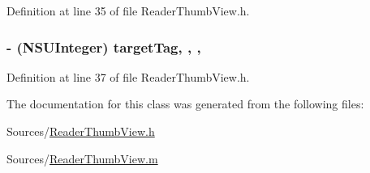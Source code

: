 Definition at line 35 of file Reader\-Thumb\-View.\-h.

\hypertarget{interface_reader_thumb_view_a41943cc8db6fb12bc967c4ea6ec4e2c5}{
\subsubsection[{target\-Tag}]{\setlength{\rightskip}{0pt plus 5cm}-\/ (N\-S\-U\-Integer) target\-Tag\hspace{0.3cm}{\ttfamily [read]}, {\ttfamily [write]}, {\ttfamily [nonatomic]}, {\ttfamily [assign]}}}\label{d8/d25/interface_reader_thumb_view_a41943cc8db6fb12bc967c4ea6ec4e2c5}


Definition at line 37 of file Reader\-Thumb\-View.\-h.



The documentation for this class was generated from the following files\-:\begin{DoxyCompactItemize}
\item 
Sources/\hyperlink{_reader_thumb_view_8h}{Reader\-Thumb\-View.\-h}\item 
Sources/\hyperlink{_reader_thumb_view_8m}{Reader\-Thumb\-View.\-m}\end{DoxyCompactItemize}
